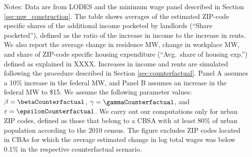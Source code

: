 \begin{table}[hbt!]
    \begin{minipage}{.95\textwidth} \footnotesize
        \vspace{2mm}
        Notes: 
        Data are from LODES and the minimum wage panel described in Section 
        \ref{sec:mw_construction}.
        The table shows averages of the estimated ZIP-code specific shares of the 
        additional income pocketed by landlords (``Share pocketed''), 
        defined as the ratio of the increase in income to the increase in rents.
        We also report the average 
        change in residence MW, change in workplace MW,
        and share of ZIP-code specific housing expenditure 
        (``Avg.\ share of housing exp.'') defined as explained in XXXX.
        Increases in income and rents are simulated following the procedure 
        described in Section \ref{sec:counterfactual}.
        Panel A assumes a 10\% increase in the federal MW, and
        Panel B assumes an increase in the federal MW to \$15.
        We assume the following parameter values:
        $\beta = \betaCounterfactual$, $\gamma = \gammaCounterfactual$, and $\varepsilon = \epsilonCounterfactual$.
        We carry out our computations only for urban ZIP codes, defined as 
        those that belong to a CBSA with at least 80\% of urban population
        according to the 2010 census.
        The figure excludes ZIP codes located in CBAs for which the average
        estimated change in log total wages was below 0.1\% in the respective
        counterfactual scenario.
    \end{minipage}
\end{table}
